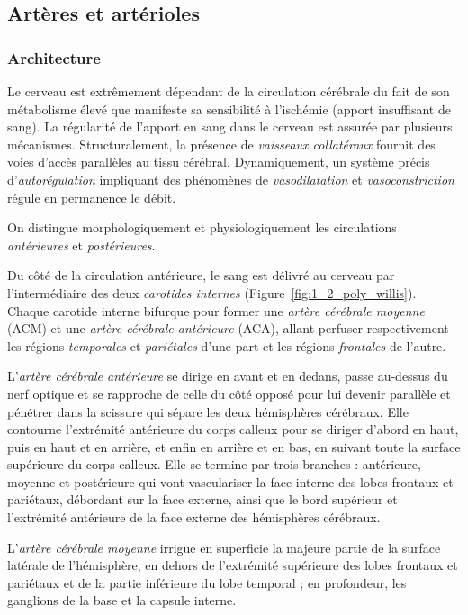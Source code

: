 \subsection{Artères et artérioles}
\label{sec:anat_art}
\subsubsection{Architecture}
Le cerveau est extrêmement dépendant de la circulation cérébrale du fait de son métabolisme élevé que manifeste sa sensibilité à l’ischémie (apport insuffisant de sang). La régularité de l’apport en sang dans le cerveau est assurée par plusieurs mécanismes. Structuralement, la présence de {\em vaisseaux collatéraux} fournit des voies d’accès parallèles au tissu cérébral. Dynamiquement, un système précis d’{\em autorégulation}  impliquant des phénomènes de {\em vasodilatation} et {\em vasoconstriction} régule en permanence le débit.

On distingue morphologiquement et physiologiquement les circulations {\em antérieures} et {\em postérieures}. 

Du côté de la circulation antérieure, le sang est délivré au cerveau par l’intermédiaire des deux {\em carotides internes} (Figure~\ref{fig:1_2_poly_willis}). Chaque carotide interne bifurque pour former une {\em artère cérébrale moyenne} (ACM) et une {\em artère cérébrale antérieure} (ACA), allant perfuser respectivement les régions {\em temporales} et {\em pariétales} d’une part et les régions {\em frontales} de l’autre. 

L’{\em artère cérébrale antérieure} se dirige en avant et en dedans, passe au-dessus du nerf optique et se rapproche de celle du côté opposé pour lui devenir parallèle et pénétrer dans la scissure qui sépare les deux hémisphères cérébraux. Elle contourne l'extrémité antérieure du corps calleux pour se diriger d'abord en haut, puis en haut et en arrière, et enfin en arrière et en bas, en suivant toute la surface supérieure du corps calleux. Elle se termine par trois branches : antérieure, moyenne et postérieure qui vont vasculariser la face interne des lobes frontaux et pariétaux, débordant sur la face externe, ainsi que le bord supérieur et l'extrémité antérieure de la face externe des hémisphères cérébraux.

L'{\em artère cérébrale moyenne} irrigue en superficie la majeure partie de la surface latérale de l'hémisphère, en dehors de l'extrémité supérieure des lobes frontaux et pariétaux et de la partie inférieure du lobe temporal ; en profondeur, les ganglions de la base et la capsule interne.


